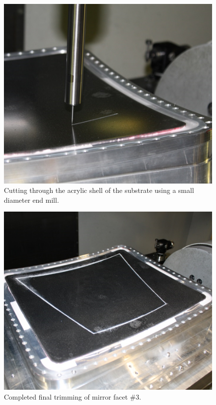 \begin{figure}[ht]
    \centering
    \includegraphics[width=1.0\linewidth]{images/Trimming_1}
    \caption{Cutting through the acrylic shell of the substrate using a small diameter end mill.}
    \label{fig:Trimming_1}
\end{figure}

\begin{figure}[ht]
    \centering
    \includegraphics[width=1.0\linewidth]{images/Trimming_2}
    \caption{Completed final trimming of mirror facet \#3.}
    \label{fig:Trimming_2}
\end{figure}

